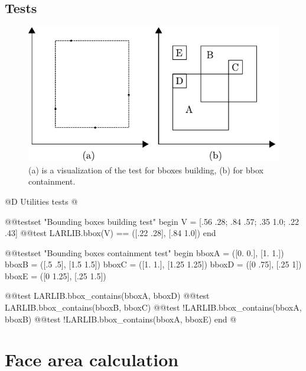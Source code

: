 \subsection{Tests}
\begin{figure}[h]
    \centering
    \includegraphics{./img/ch5-bboxes.pdf}
    \caption{(a) is a visualization of the test for bboxes building, (b) for bbox containment.}
\end{figure}
@D Utilities tests
@{@@testset "Bounding boxes building test" begin
    V = [.56 .28; .84 .57; .35  1.0; .22  .43]
    @@test LARLIB.bbox(V) == ([.22 .28], [.84 1.0])
end

@@testset "Bounding boxes containment test" begin
    bboxA = ([0. 0.], [1. 1.])
    bboxB = ([.5 .5], [1.5 1.5])
    bboxC = ([1. 1.], [1.25 1.25])
    bboxD = ([0 .75], [.25 1])
    bboxE = ([0 1.25], [.25 1.5])

    @@test LARLIB.bbox_contains(bboxA, bboxD)
    @@test LARLIB.bbox_contains(bboxB, bboxC)
    @@test !LARLIB.bbox_contains(bboxA, bboxB)
    @@test !LARLIB.bbox_contains(bboxA, bboxE)
end
@}

\section{Face area calculation}
\label{sec:face_area}

